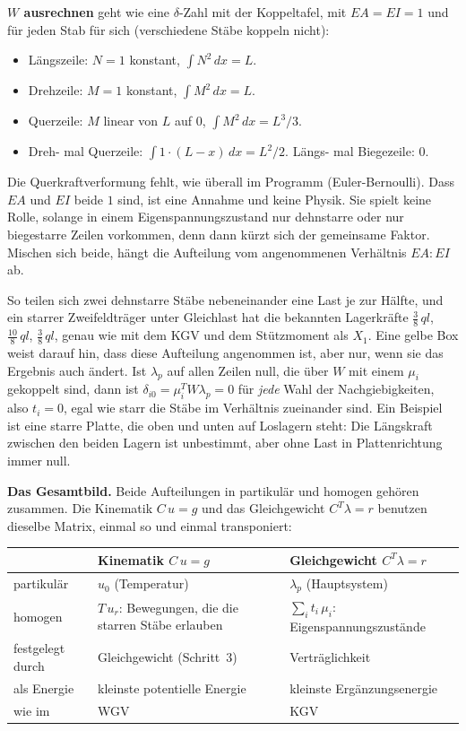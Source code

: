 \textbf{$W$ ausrechnen} geht wie eine $\delta$-Zahl mit der Koppeltafel, mit $EA = EI = 1$ und für
jeden Stab für sich (verschiedene Stäbe koppeln nicht):
\begin{itemize}
  \item Längszeile: $N = 1$ konstant, $\int N^2\,dx = L$.
  \item Drehzeile: $M = 1$ konstant, $\int M^2\,dx = L$.
  \item Querzeile: $M$ linear von $L$ auf $0$, $\int M^2\,dx = L^3/3$.
  \item Dreh- mal Querzeile: $\int 1 \cdot (L - x)\,dx = L^2/2$. Längs- mal Biegezeile: $0$.
\end{itemize}
Die Querkraftverformung fehlt, wie überall im Programm (Euler-Bernoulli). Dass $EA$ und $EI$ beide
$1$ sind, ist eine Annahme und keine Physik. Sie spielt keine Rolle, solange in einem
Eigenspannungszustand nur dehnstarre oder nur biegestarre Zeilen vorkommen, denn dann kürzt sich der
gemeinsame Faktor. Mischen sich beide, hängt die Aufteilung vom angenommenen Verhältnis $EA : EI$
ab.

So teilen sich zwei dehnstarre Stäbe nebeneinander eine Last je zur Hälfte, und ein starrer
Zweifeldträger unter Gleichlast hat die bekannten Lagerkräfte $\frac38\,ql$, $\frac{10}8\,ql$,
$\frac38\,ql$, genau wie mit dem KGV und dem Stützmoment als $X_1$. Eine gelbe Box weist darauf
hin, dass diese Aufteilung angenommen ist, aber nur, wenn sie das Ergebnis auch ändert. Ist
$\lambda_p$ auf allen Zeilen null, die über $W$ mit einem $\mu_i$ gekoppelt sind, dann ist
$\delta_{i0} = \mu_i^T W \lambda_p = 0$ für \emph{jede} Wahl der Nachgiebigkeiten, also $t_i = 0$, egal wie
starr die Stäbe im Verhältnis zueinander sind. Ein Beispiel ist eine starre Platte, die oben und
unten auf Loslagern steht: Die Längskraft zwischen den beiden Lagern ist unbestimmt, aber ohne Last
in Plattenrichtung immer null.

\textbf{Das Gesamtbild.} Beide Aufteilungen in partikulär und homogen gehören zusammen. Die
Kinematik $C\,u = g$ und das Gleichgewicht $C^T\lambda = r$ benutzen dieselbe Matrix, einmal so und
einmal transponiert:

\begin{center}
\begin{tabular}{@{}p{2.9cm}p{5.9cm}p{5.9cm}@{}}
  \toprule
   & \textbf{Kinematik} $C\,u = g$ & \textbf{Gleichgewicht} $C^T\lambda = r$ \\
  \midrule
  partikulär       & $u_0$ (Temperatur) & $\lambda_p$ (Hauptsystem) \\
  homogen          & $T\,u_r$: Bewegungen, die die starren Stäbe erlauben
                   & $\sum_i t_i\,\mu_i$: Eigenspannungszustände \\
  festgelegt durch & Gleichgewicht (Schritt~3) & Verträglichkeit \\
  als Energie      & kleinste potentielle Energie & kleinste Ergänzungsenergie \\
  wie im           & WGV & KGV \\
  \bottomrule
\end{tabular}
\end{center}

